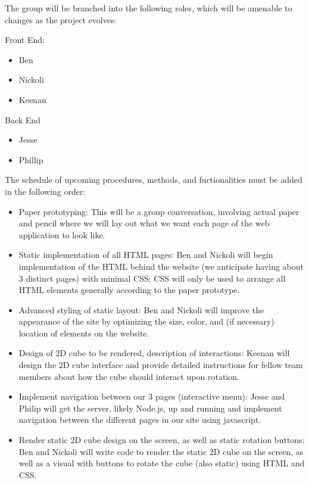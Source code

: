 \documentclass[12pt]{article}
\begin{document}
\par 
The group will be branched into the following roles, which will be amenable to changes as the project evolves: \\
\par
Front End:
\begin{itemize}
\item Ben
\item Nickoli
\item Keenan
\end{itemize}
\par
Back End
\begin{itemize}
\item Jesse
\item Phillip
\end{itemize}


\par
The schedule of upcoming procedures, methods, and fuctionalities must be added in the following order: \\

\begin{itemize}
\item Paper prototyping: This will be a group conversation, involving actual paper and pencil where we will lay out what we want each page of the web application to look like.
\item Static implementation of all HTML pages: Ben and Nickoli will begin implementation of the HTML behind the website (we anticipate having about 3 distinct pages) with minimal CSS; CSS will only be used to arrange all HTML elements generally according to the paper prototype.
\item Advanced styling of static layout: Ben and Nickoli will improve the appearance of the site by optimizing the size, color, and (if necessary) location of elements on the website.
\item Design of 2D cube to be rendered, description of interactions: Keenan will design the 2D cube interface and provide detailed instructions for fellow team members about how the cube should interact upon rotation.
\item Implement navigation between our 3 pages (interactive menu): Jesse and Philip will get the server, likely Node.js, up and running and implement navigation between the different pages in our site using javascript.
\item Render static 2D cube design on the screen, as well as static rotation buttons: Ben and Nickoli will write code to render the static 2D cube on the screen, as well as a visual with buttons to rotate the cube (also static) using HTML and CSS.
\end{itemize}
\end{document}
